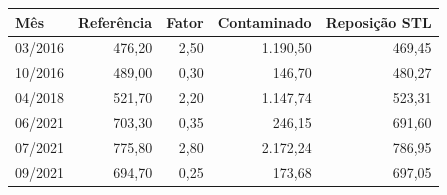 \begin{tabular}{lrrrr}
\toprule
Mês & Referência & Fator & Contaminado & Reposição STL \\
\midrule
03/2016 & 476,20 & 2,50 & 1.190,50 & 469,45 \\
10/2016 & 489,00 & 0,30 & 146,70 & 480,27 \\
04/2018 & 521,70 & 2,20 & 1.147,74 & 523,31 \\
06/2021 & 703,30 & 0,35 & 246,15 & 691,60 \\
07/2021 & 775,80 & 2,80 & 2.172,24 & 786,95 \\
09/2021 & 694,70 & 0,25 & 173,68 & 697,05 \\
\bottomrule
\end{tabular}
